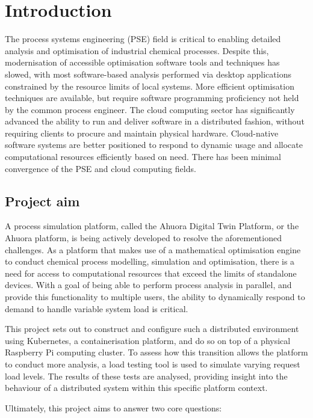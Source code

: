 \chapter{Introduction}
\label{sec:intro}

The process systems engineering (PSE) field is critical to enabling detailed analysis and optimisation of industrial chemical processes. Despite this, modernisation of accessible optimisation software tools and techniques has slowed, with most software-based analysis performed via desktop applications constrained by the resource limits of local systems. More efficient optimisation techniques are available, but require software programming proficiency not held by the common process engineer. The cloud computing sector has significantly advanced the ability to run and deliver software in a distributed fashion, without requiring clients to procure and maintain physical hardware. Cloud-native software systems are better positioned to respond to dynamic usage and allocate computational resources efficiently based on need. There has been minimal convergence of the PSE and cloud computing fields.

\section{Project aim}

A process simulation platform, called the Ahuora Digital Twin Platform, or the Ahuora platform, is being actively developed to resolve the aforementioned challenges. As a platform that makes use of a mathematical optimisation engine to conduct chemical process modelling, simulation and optimisation, there is a need for access to computational resources that exceed the limits of standalone devices. With a goal of being able to perform process analysis in parallel, and provide this functionality to multiple users, the ability to dynamically respond to demand to handle variable system load is critical.

This project sets out to construct and configure such a distributed environment using Kubernetes, a containerisation platform, and do so on top of a physical Raspberry Pi computing cluster. To assess how this transition allows the platform to conduct more analysis, a load testing tool is used to simulate varying request load levels. The results of these tests are analysed, providing insight into the behaviour of a distributed system within this specific platform context.

Ultimately, this project aims to answer two core questions:


